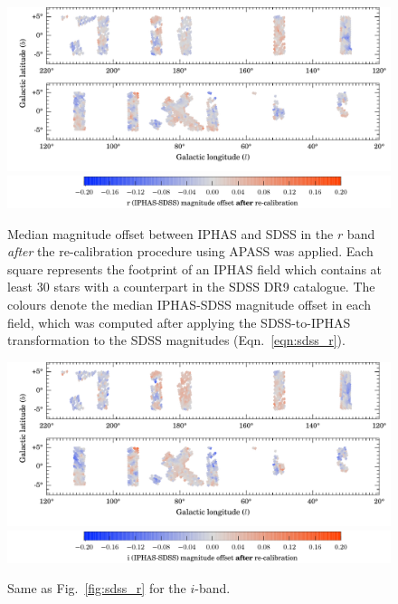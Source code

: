 \documentclass[a4paper,useAMS,usenatbib]{mn2e}
\begin{document}
\begin{figure}
    \includegraphics[width=\textwidth]{figures/calibration/SDSS-IPHAS_rshift.pdf}
    \includegraphics[width=\textwidth]{figures/calibration/colourbar_sdss_r.pdf} 
    \caption{Median magnitude offset between IPHAS and SDSS in the $r$ band
             \emph{after} the re-calibration procedure using APASS was applied.
             Each square represents the footprint of an IPHAS field
             which contains at least 30 stars
             with a counterpart in the SDSS DR9 catalogue.
             The colours denote the median IPHAS-SDSS magnitude offset
             in each field,
             which was computed after applying the SDSS-to-IPHAS
             transformation to the SDSS magnitudes (Eqn.~\ref{eqn:sdss_r}).}
    \label{fig:sdss_r}
    \vspace{1cm}
    \includegraphics[width=\textwidth]{figures/calibration/SDSS-IPHAS_ishift.pdf}
    \includegraphics[width=\textwidth]{figures/calibration/colourbar_sdss_i.pdf} 
    \caption{Same as Fig.~\ref{fig:sdss_r} for the $i$-band.}
    \label{fig:sdss_i}
\end{figure}
\end{document}
